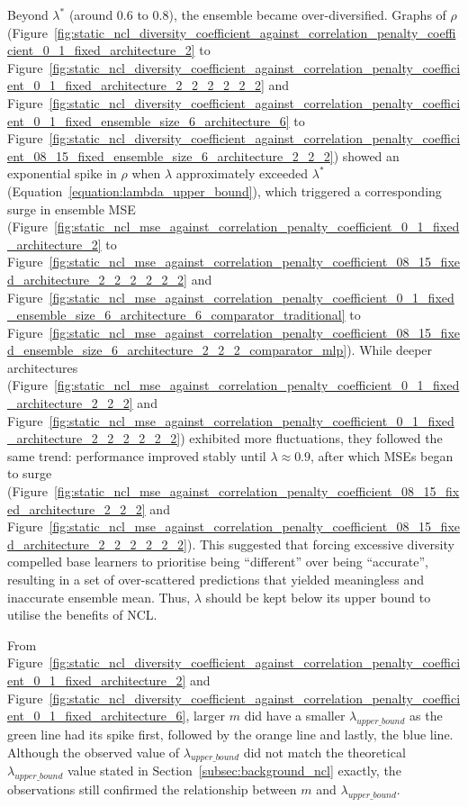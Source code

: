 Beyond $\lambda^*$ (around $0.6$ to $0.8$), the ensemble became over-diversified. Graphs of $\rho$ (Figure~\ref{fig:static_ncl_diversity_coefficient_against_correlation_penalty_coefficient_0_1_fixed_architecture_2} to Figure~\ref{fig:static_ncl_diversity_coefficient_against_correlation_penalty_coefficient_0_1_fixed_architecture_2_2_2_2_2_2} and Figure~\ref{fig:static_ncl_diversity_coefficient_against_correlation_penalty_coefficient_0_1_fixed_ensemble_size_6_architecture_6} to Figure~\ref{fig:static_ncl_diversity_coefficient_against_correlation_penalty_coefficient_08_15_fixed_ensemble_size_6_architecture_2_2_2}) showed an exponential spike in $\rho$ when $\lambda$ approximately exceeded $\lambda^*$ (Equation~\ref{equation:lambda_upper_bound}), which triggered a corresponding surge in ensemble MSE (Figure~\ref{fig:static_ncl_mse_against_correlation_penalty_coefficient_0_1_fixed_architecture_2} to Figure~\ref{fig:static_ncl_mse_against_correlation_penalty_coefficient_08_15_fixed_architecture_2_2_2_2_2_2} and Figure~\ref{fig:static_ncl_mse_against_correlation_penalty_coefficient_0_1_fixed_ensemble_size_6_architecture_6_comparator_traditional} to Figure~\ref{fig:static_ncl_mse_against_correlation_penalty_coefficient_08_15_fixed_ensemble_size_6_architecture_2_2_2_comparator_mlp}). While deeper architectures (Figure~\ref{fig:static_ncl_mse_against_correlation_penalty_coefficient_0_1_fixed_architecture_2_2_2} and Figure~\ref{fig:static_ncl_mse_against_correlation_penalty_coefficient_0_1_fixed_architecture_2_2_2_2_2_2}) exhibited more fluctuations, they followed the same trend: performance improved stably until $\lambda \approx 0.9$, after which MSEs began to surge (Figure~\ref{fig:static_ncl_mse_against_correlation_penalty_coefficient_08_15_fixed_architecture_2_2_2} and Figure~\ref{fig:static_ncl_mse_against_correlation_penalty_coefficient_08_15_fixed_architecture_2_2_2_2_2_2}). This suggested that forcing excessive diversity compelled base learners to prioritise being ``different'' over being ``accurate'', resulting in a set of over-scattered predictions that yielded meaningless and inaccurate ensemble mean. Thus, $\lambda$ should be kept below its upper bound to utilise the benefits of NCL. 

From Figure~\ref{fig:static_ncl_diversity_coefficient_against_correlation_penalty_coefficient_0_1_fixed_architecture_2} and Figure~\ref{fig:static_ncl_diversity_coefficient_against_correlation_penalty_coefficient_0_1_fixed_architecture_6}, larger $m$ did have a smaller $\lambda_{upper\_bound}$ as the green line had its spike first, followed by the orange line and lastly, the blue line. Although the observed value of $\lambda_{upper\_bound}$ did not match the theoretical $\lambda_{upper\_bound}$ value stated in Section~\ref{subsec:background_ncl} exactly, the observations still confirmed the relationship between $m$ and $\lambda_{upper\_bound}$. 

